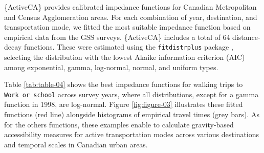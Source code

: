 \documentclass[Royal,times,sageh]{sagej}
\begin{document}
\{ActiveCA\} provides calibrated impedance functions for Canadian
Metropolitan and Census Agglomeration areas. For each combination of
year, destination, and transportation mode, we fitted the most suitable
impedance function based on empirical data from the GSS surveys.
\{ActiveCA\} includes a total of 64 distance-decay functions. These were
estimated using the \texttt{fitdistrplus} package
\citep{mullerdutang2015}, selecting the distribution with the lowest
Akaike information criterion (AIC) among exponential, gamma, log-normal,
normal, and uniform types.

Table \ref{tab:table-04} shows the best impedance functions for walking
trips to \texttt{Work\ or\ school} across survey years, where all
distributions, except for a gamma function in 1998, are log-normal.
Figure \ref{fig:figure-03} illustrates these fitted functions (red line)
alongside histograms of empirical travel times (grey bars). As for the
others functions, these examples enable to calculate gravity-based
accessibility measures for active transportation modes across various
destinations and temporal scales in Canadian urban areas.

\begin{table}
\centering
\caption{\label{tab:table-04}\label{table-04}Impedance functions and AIC for `Walking` trips considering `Work or school` as destination.}
\centering
{}
\end{table}
\end{document}
